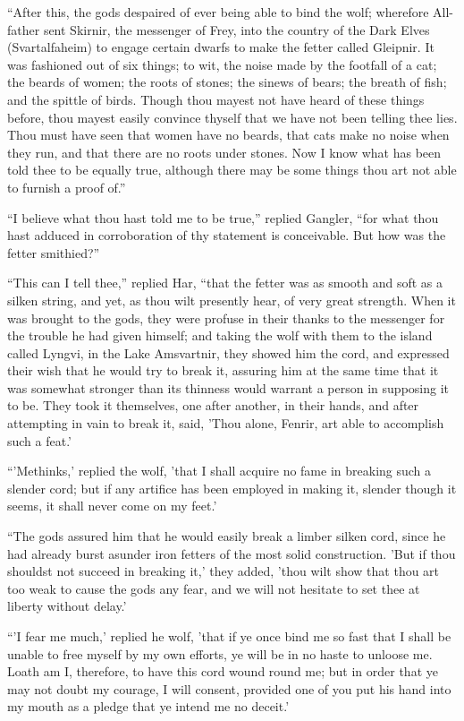 
``After this, the gods despaired of ever being able to bind the wolf;
wherefore All-father sent Skirnir, the messenger of Frey, into the
country of the Dark Elves (Svartalfaheim) to engage certain dwarfs to
make the fetter called Gleipnir. It was fashioned out of six things;
to wit, the noise made by the footfall of a cat; the beards of women;
the roots of stones; the sinews of bears; the breath of fish; and the
spittle of birds. Though thou mayest not have heard of these things
before, thou mayest easily convince thyself that we have not been
telling thee lies. Thou must have seen that women have no beards, that
cats make no noise when they run, and that there are no roots under
stones. Now I know what has been told thee to be equally true,
although there may be some things thou art not able to furnish a proof
of.''

``I believe what thou hast told me to be true,'' replied Gangler, ``for
what thou hast adduced in corroboration of thy statement is
conceivable. But how was the fetter smithied?''

``This can I tell thee,'' replied Har, ``that the fetter was as smooth
and soft as a silken string, and yet, as thou wilt presently hear, of
very great strength. When it was brought to the gods, they were
profuse in their thanks to the messenger for the trouble he had given
himself; and taking the wolf with them to the island called Lyngvi, in
the Lake Amsvartnir, they showed him the cord, and expressed their
wish that he would try to break it, assuring him at the same time that
it was somewhat stronger than its thinness would warrant a person in
supposing it to be. They took it themselves, one after another, in
their hands, and after attempting in vain to break it, said, 'Thou
alone, Fenrir, art able to accomplish such a feat.'

``'Methinks,' replied the wolf, 'that I shall acquire no fame in
breaking such a slender cord; but if any artifice has been employed in
making it, slender though it seems, it shall never come on my feet.'

``The gods assured him that he would easily break a limber silken cord,
since he had already burst asunder iron fetters of the most solid
construction. 'But if thou shouldst not succeed in breaking it,' they
added, 'thou wilt show that thou art too weak to cause the gods any
fear, and we will not hesitate to set thee at liberty without delay.'

``'I fear me much,' replied he wolf, 'that if ye once bind me so fast
that I shall be unable to free myself by my own efforts, ye will be in
no haste to unloose me. Loath am I, therefore, to have this cord wound
round me; but in order that ye may not doubt my courage, I will
consent, provided one of you put his hand into my mouth as a pledge
that ye intend me no deceit.'


